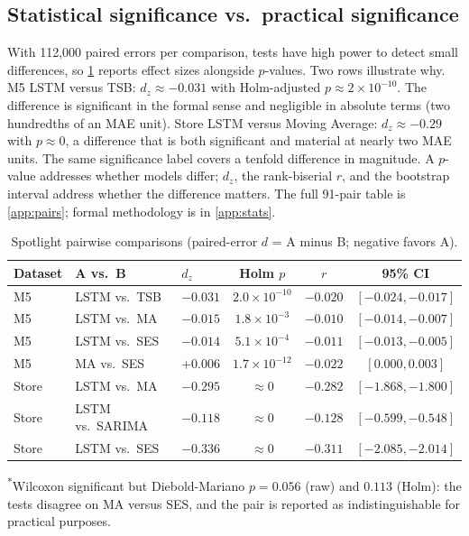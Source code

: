 \subsection{Statistical significance vs.\ practical significance}
\label{sec:sig-vs-pract}
With 112,000 paired errors per comparison, tests have high power to detect
small differences, so \cref{tab:spotlight} reports effect sizes alongside
$p$-values. Two rows illustrate why. M5 LSTM versus TSB: $d_z \approx -0.031$
with Holm-adjusted $p \approx 2\times10^{-10}$. The difference is significant
in the formal sense and negligible in absolute terms (two hundredths of an
MAE unit). Store LSTM versus Moving Average: $d_z \approx -0.29$ with
$p \approx 0$, a difference that is both significant and material at nearly
two MAE units. The same significance label covers a tenfold difference in
magnitude. A $p$-value addresses whether models differ; $d_z$, the
rank-biserial $r$, and the bootstrap interval address whether the difference
matters. The full 91-pair table is \cref{app:pairs}; formal methodology is in
\cref{app:stats}.

\begin{table}[H]
\centering
\caption{Spotlight pairwise comparisons (paired-error $d$ = A minus B; negative favors A).}
\label{tab:spotlight}
\begin{tabular}{lllccc}
\toprule
Dataset & A vs.\ B & $d_z$ & Holm $p$ & $r$ & 95\% CI \\
\midrule
M5 & LSTM vs.\ TSB & $-0.031$ & $2.0{\times}10^{-10}$ & $-0.020$ & $[-0.024,-0.017]$ \\
M5 & LSTM vs.\ MA & $-0.015$ & $1.8{\times}10^{-3}$ & $-0.010$ & $[-0.014,-0.007]$ \\
M5 & LSTM vs.\ SES & $-0.014$ & $5.1{\times}10^{-4}$ & $-0.011$ & $[-0.013,-0.005]$ \\
M5 & MA vs.\ SES & $+0.006$ & $1.7{\times}10^{-12}$\rlap{\textsuperscript{*}} & $-0.022$ & $[0.000,0.003]$ \\
Store & LSTM vs.\ MA & $-0.295$ & $\approx$0 & $-0.282$ & $[-1.868,-1.800]$ \\
Store & LSTM vs.\ SARIMA & $-0.118$ & $\approx$0 & $-0.128$ & $[-0.599,-0.548]$ \\
Store & LSTM vs.\ SES & $-0.336$ & $\approx$0 & $-0.311$ & $[-2.085,-2.014]$ \\
\bottomrule
\end{tabular}
\end{table}
\noindent\textsuperscript{*}Wilcoxon significant but Diebold-Mariano $p=0.056$
(raw) and $0.113$ (Holm): the tests disagree on MA versus SES, and the pair
is reported as indistinguishable for practical purposes.


